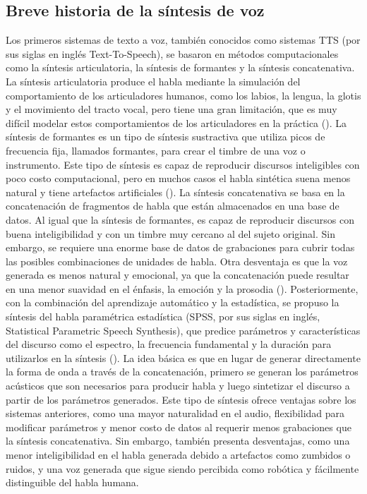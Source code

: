 \subsection{Breve historia de la síntesis de voz}
Los primeros sistemas de texto a voz, también conocidos como sistemas TTS (por sus siglas en inglés Text-To-Speech), se basaron en métodos computacionales como la síntesis articulatoria, la síntesis de formantes y la síntesis concatenativa. La síntesis articulatoria produce el habla mediante la simulación del comportamiento de los articuladores humanos, como los labios, la lengua, la glotis y el movimiento del tracto vocal, pero tiene una gran limitación, que es muy difícil modelar estos comportamientos de los articuladores en la práctica (\cite{coker1976}). La síntesis de formantes es un tipo de síntesis sustractiva que utiliza picos de frecuencia fija, llamados formantes, para crear el timbre de una voz o instrumento. Este tipo de síntesis es capaz de reproducir discursos inteligibles con poco costo computacional, pero en muchos casos el habla sintética suena menos natural y tiene artefactos artificiales (\cite{seeviour1976}). La síntesis concatenativa se basa en la concatenación de fragmentos de habla que están almacenados en una base de datos. Al igual que la síntesis de formantes, es capaz de reproducir discursos con buena inteligibilidad y con un timbre muy cercano al del sujeto original. Sin embargo, se requiere una enorme base de datos de grabaciones para cubrir todas las posibles combinaciones de unidades de habla. Otra desventaja es que la voz generada es menos natural y emocional, ya que la concatenación puede resultar en una menor suavidad en el énfasis, la emoción y la prosodia (\cite{olive1977}). Posteriormente, con la combinación del aprendizaje automático y la estadística, se propuso la síntesis del habla paramétrica estadística (SPSS, por sus siglas en inglés, Statistical Parametric Speech Synthesis), que predice parámetros y características del discurso como el espectro, la frecuencia fundamental y la duración para utilizarlos en la síntesis (\cite{zen2009}). 
La idea básica es que en lugar de generar directamente la forma de onda a través de la concatenación, primero se generan los parámetros acústicos que son necesarios para producir habla y luego sintetizar el discurso a partir de los parámetros generados. Este tipo de síntesis ofrece ventajas sobre los sistemas anteriores, como una mayor naturalidad en el audio, flexibilidad para modificar parámetros y menor costo de datos al requerir menos grabaciones que la síntesis concatenativa. Sin embargo, también presenta desventajas, como una menor inteligibilidad en el habla generada debido a artefactos como zumbidos o ruidos, y una voz generada que sigue siendo percibida como robótica y fácilmente distinguible del habla humana.



